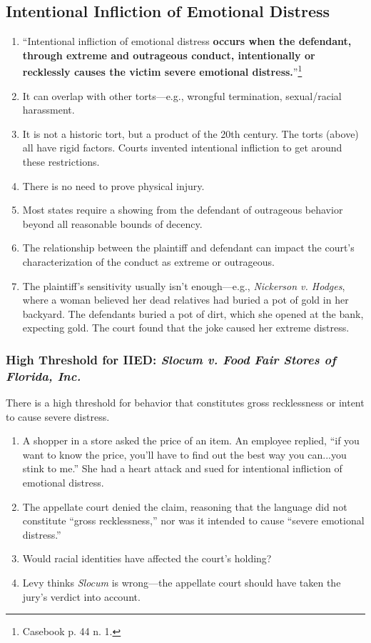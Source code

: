 \subsection{Intentional Infliction of Emotional Distress}

\begin{enumerate}
    \item ``Intentional infliction of emotional distress \textbf{occurs when 
    the defendant, through extreme and outrageous conduct, intentionally or 
    recklessly causes the victim severe emotional 
    distress.}''\footnote{Casebook p. 44 n. 1.}
    \item It can overlap with other torts---e.g., wrongful termination, 
    sexual/racial harassment.
    \item It is not a historic tort, but a product of the 20th century. The 
    torts (above) all have rigid factors. Courts invented intentional 
    infliction to get around these restrictions.
    \item There is no need to prove physical injury. %
    \item Most states require a showing from the defendant of outrageous 
    behavior beyond all reasonable bounds of decency.
    \item The relationship between the plaintiff and defendant can impact the 
    court's characterization of the conduct as extreme or outrageous.
    \item The plaintiff's sensitivity usually isn't enough---e.g., 
    \emph{Nickerson v. Hodges}, where a woman believed her dead relatives had 
    buried a pot of gold in her backyard. The defendants buried a pot of dirt, 
    which she opened at the bank, expecting gold. The court found that the 
    joke caused her extreme distress.
\end{enumerate}

\subsubsection{High Threshold for IIED: \emph{Slocum v. Food Fair Stores of 
Florida, Inc.}}

There is a high threshold for behavior that constitutes gross recklessness or 
intent to cause severe distress.

\begin{enumerate}
    \item A shopper in a store asked the price of an item. An employee 
    replied, ``if you want to know the price, you'll have to find out the best 
    way you can...you stink to me.'' She had a heart attack and sued for 
    intentional infliction of emotional distress.
    \item The appellate court denied the claim, reasoning that the language 
    did not constitute ``gross recklessness,'' nor was it intended to cause 
    ``severe emotional distress.''
    \item Would racial identities have affected the court's holding?
    \item Levy thinks \emph{Slocum} is wrong---the appellate court should have 
    taken the jury's verdict into account.
\end{enumerate}

